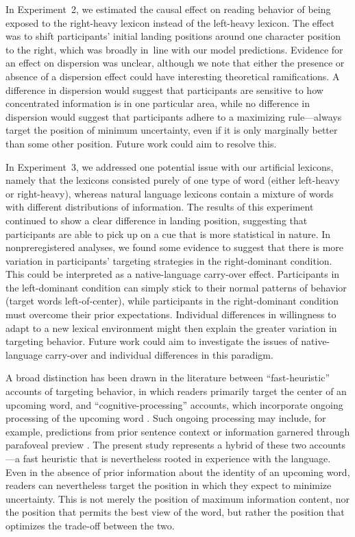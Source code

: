 \documentclass[doc,biblatex]{apa7}
\begin{document}
In Experiment~2, we estimated the causal effect on reading behavior of being exposed to the right-heavy lexicon instead of the left-heavy lexicon. The effect was to shift participants' initial landing positions around one character position to the right, which was broadly in~line with our model predictions. Evidence for an effect on dispersion was unclear, although we note that either the presence or absence of a dispersion effect could have interesting theoretical ramifications. A difference in dispersion would suggest that participants are sensitive to how concentrated information is in one particular area, while no difference in dispersion would suggest that participants adhere to a maximizing rule---always target the position of minimum uncertainty, even if it is only marginally better than some other position. Future work could aim to resolve this.

In Experiment~3, we addressed one potential issue with our artificial lexicons, namely that the lexicons consisted purely of one type of word (either left-heavy or right-heavy), whereas natural language lexicons contain a mixture of words with different distributions of information. The results of this experiment continued to show a clear difference in landing position, suggesting that participants are able to pick up on a cue that is more statistical in nature. In nonpreregistered analyses, we found some evidence to suggest that there is more variation in participants' targeting strategies in the right-dominant condition. This could be interpreted as a native-language carry-over effect. Participants in the left-dominant condition can simply stick to their normal patterns of behavior (target words left-of-center), while participants in the right-dominant condition must overcome their prior expectations. Individual differences in willingness to adapt to a new lexical environment might then explain the greater variation in targeting behavior. Future work could aim to investigate the issues of native-language carry-over and individual differences in this paradigm.

A broad distinction has been drawn in the literature between ``fast-heuristic'' accounts of targeting behavior, in which readers primarily target the center of an upcoming word, and ``cognitive-processing'' accounts, which incorporate ongoing processing of the upcoming word \parencite{Bicknell:2020}. Such ongoing processing may include, for example, predictions from prior sentence context \parencite{Balota:1985} or information garnered through parafoveal preview \parencite{Hyona:1989, Underwood:1990, Schotter:2011}. The present study represents a hybrid of these two accounts---a fast heuristic that is nevertheless rooted in experience with the language. Even in the absence of prior information about the identity of an upcoming word, readers can nevertheless target the position in which they expect to minimize uncertainty. This is not merely the position of maximum information content, nor the position that permits the best view of the word, but rather the position that optimizes the trade-off between the two.
\end{document}
